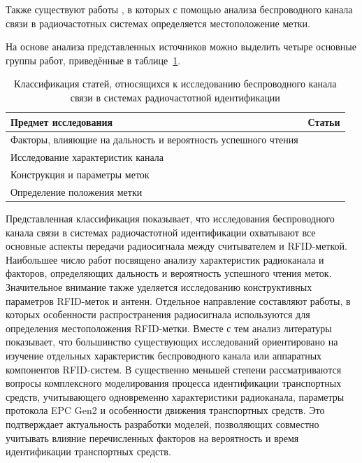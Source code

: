 \documentclass[12pt]{article}
\theoremstyle{definition}
\begin{document}
Также существуют работы \cite{Nikitin2010, Xie2025, Alireza2026, Zheng2025}, в которых с помощью анализа беспроводного канала связи в радиочастотных системах определяется местоположение метки.

На основе анализа представленных источников можно выделить четыре основные группы работ, приведённые в таблице~\ref{table:channel}.

\begin{table}[h]
\centering
\renewcommand{\arraystretch}{1.3}
\begin{tabularx}{\textwidth}{>{\raggedright\arraybackslash}X >{\raggedright\arraybackslash}X}
\toprule
\rowcolor{gray!25}
\textbf{Предмет исследования} & \textbf{Статьи} \\
\midrule
Факторы, влияющие на дальность и вероятность успешного чтения &
\cite{Nikitin2006, Nikitin2009, Nikitin2008, Bakri2025, Borgna2025, ElHadidy2025, Zheng2026}
\\
Исследование характеристик канала &
\cite{Nikitin2006b, Marrocco, Banerjee2007, Banerjee2008, Griffin2007, Griffin2009, Trotter2009, Hasan2011, Dimitriou2014, Alhassoun2019, ElAbsi2023, Padmal2024, Kaifas2024, Yang2026, Long2025}
\\
Конструкция и параметры меток &
\cite{Rao2008, MarrocMarroccoG, Mayer2007, Nikitin2012, Nikitin2009, Rocha2024, Bendavid2024}
\\
Определение положения метки &
\cite{Nikitin2010, Xie2025, Alireza2026, Zheng2025}
\\
\bottomrule
\end{tabularx}
\caption{Классификация статей, относящихся к исследованию беспроводного канала связи в системах радиочастотной идентификации}
\label{table:channel}
\end{table}

Представленная классификация показывает, что исследования беспроводного канала связи в системах радиочастотной идентификации охватывают все основные аспекты передачи радиосигнала между считывателем и RFID-меткой. Наибольшее число работ посвящено анализу характеристик радиоканала и факторов, определяющих дальность и вероятность успешного чтения меток. Значительное внимание также уделяется исследованию конструктивных параметров RFID-меток и антенн. Отдельное направление составляют работы, в которых особенности распространения радиосигнала используются для определения местоположения RFID-метки. Вместе с тем анализ литературы показывает, что большинство существующих исследований ориентировано на изучение отдельных характеристик беспроводного канала или аппаратных компонентов RFID-систем. В существенно меньшей степени рассматриваются вопросы комплексного моделирования процесса идентификации транспортных средств, учитывающего одновременно характеристики радиоканала, параметры протокола EPC Gen2 и особенности движения транспортных средств. Это подтверждает актуальность разработки моделей, позволяющих совместно учитывать влияние перечисленных факторов на вероятность и время идентификации транспортных средств.
\end{document}
